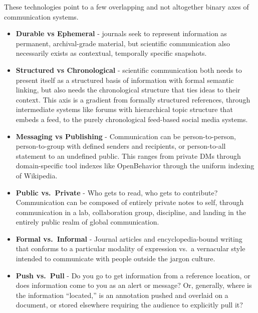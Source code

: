 These technologies point to a few overlapping and not altogether binary
axes of communication systems.

\begin{itemize}

\item
  \textbf{Durable vs Ephemeral} - journals seek to represent information
  as permanent, archival-grade material, but scientific communication
  also necessarily exists as contextual, temporally specific snapshots.
\item
  \textbf{Structured vs Chronological} - scientific communication both
  needs to present itself as a structured basis of information with
  formal semantic linking, but also needs the chronological structure
  that ties ideas to their context. This axis is a gradient from
  formally structured references, through intermediate systems like
  forums with hierarchical topic structure that embeds a feed, to the
  purely chronological feed-based social media systems.
\item
  \textbf{Messaging vs Publishing} - Communication can be
  person-to-person, person-to-group with defined senders and recipients,
  or person-to-all statement to an undefined public. This ranges from
  private DMs through domain-specific tool indexes like OpenBehavior
  through the uniform indexing of Wikipedia.
\item
  \textbf{Public vs.~Private} - Who gets to read, who gets to
  contribute? Communication can be composed of entirely private notes to
  self, through communication in a lab, collaboration group, discipline,
  and landing in the entirely public realm of global communication.
\item
  \textbf{Formal vs.~Informal} - Journal articles and encyclopedia-bound
  writing that conforms to a particular modality of expression vs.~a
  vernacular style intended to communicate with people outside the
  jargon culture.
\item
  \textbf{Push vs.~Pull} - Do you go to get information from a reference
  location, or does information come to you as an alert or message? Or,
  generally, where is the information ``located,'' is an annotation
  pushed and overlaid on a document, or stored elsewhere requiring the
  audience to explicitly pull it?
\end{itemize}

